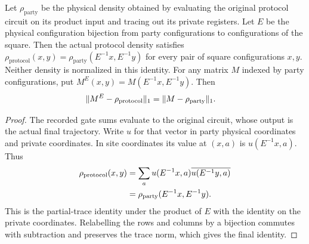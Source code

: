\begin{theorem}
    \label{thm:peps_dyadic_protocol_density_coordinates}
    \leanok
    Let $\rho_{\mathrm{party}}$ be the physical density obtained by evaluating
    the original protocol circuit on its product input and tracing out its
    private registers. Let $E$ be the physical configuration bijection from
    party configurations to configurations of the square. Then the actual
    protocol density satisfies
    $\rho_{\mathrm{protocol}}(x,y)
        =\rho_{\mathrm{party}}(E^{-1}x,E^{-1}y)$ for every pair of square
    configurations $x,y$. Neither density is normalized in this identity.
    For any matrix $M$ indexed by party configurations, put
    $M^E(x,y)=M(E^{-1}x,E^{-1}y)$. Then
    \begin{align}
        \|M^E-\rho_{\mathrm{protocol}}\|_1
         & =\|M-\rho_{\mathrm{party}}\|_1.\notag
    \end{align}
\end{theorem}
\begin{proof}\leanok
    The recorded gate sums evaluate to the original circuit, whose output is
    the actual final trajectory. Write $u$ for that vector in party physical
    coordinates and private coordinates. In site coordinates its value at
    $(x,a)$ is $u(E^{-1}x,a)$. Thus
    \begin{align}
        \rho_{\mathrm{protocol}}(x,y)
         & =\sum_a u(E^{-1}x,a)\overline{u(E^{-1}y,a)} \notag \\
         & =\rho_{\mathrm{party}}(E^{-1}x,E^{-1}y).\notag
    \end{align}
    This is the partial-trace identity under the product of $E$ with the
    identity on the private coordinates. Relabelling the rows and columns
    by a bijection commutes with subtraction and preserves the trace norm,
    which gives the final identity.
\end{proof}
